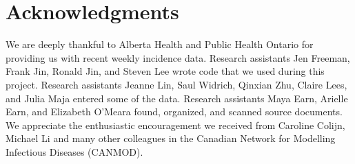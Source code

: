 \documentclass[10pt,letterpaper]{article}
\begin{document}



\section*{Acknowledgments}

We are deeply thankful to Alberta Health and Public Health Ontario for providing us with recent weekly incidence data. Research assistants Jen Freeman, Frank Jin, Ronald Jin, and Steven Lee wrote code that we used during this project. Research assistants Jeanne Lin, Saul Widrich, Qinxian Zhu, Claire Lees, and Julia Maja entered some of the data. Research assistants Maya Earn, Arielle Earn, and Elizabeth O'Meara found, organized, and scanned source documents.  We appreciate the enthusiastic encouragement we received from Caroline Colijn, Michael Li and many other colleagues in the Canadian Network for Modelling Infectious Diseases (CANMOD).

\nolinenumbers

%
%


\end{document}
